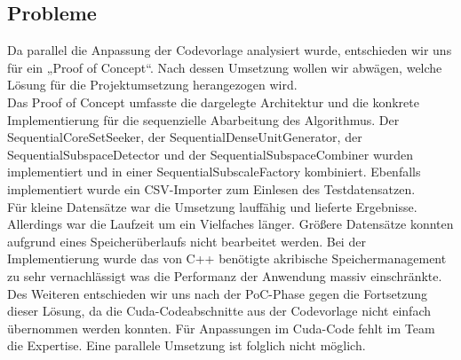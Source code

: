 \subsection{Probleme}
Da parallel die Anpassung der Codevorlage analysiert wurde, entschieden wir uns für ein „Proof of Concept“. Nach dessen
Umsetzung wollen wir abwägen, welche Lösung für die Projektumsetzung herangezogen wird.\\
Das Proof of Concept umfasste die dargelegte Architektur und die konkrete Implementierung für die sequenzielle
Abarbeitung des Algorithmus. Der SequentialCoreSetSeeker, der SequentialDenseUnitGenerator, der
SequentialSubspaceDetector und der SequentialSubspaceCombiner wurden implementiert und in einer
SequentialSubscaleFactory kombiniert. Ebenfalls implementiert wurde ein CSV-Importer zum Einlesen des Testdatensatzen.\\
Für kleine Datensätze war die Umsetzung lauffähig und lieferte Ergebnisse. Allerdings war die Laufzeit um ein Vielfaches
länger. Größere Datensätze konnten aufgrund eines Speicherüberlaufs nicht bearbeitet werden. Bei der Implementierung
wurde das von C++ benötigte akribische Speichermanagement zu sehr vernachlässigt was die Performanz der Anwendung massiv
einschränkte.\\
Des Weiteren entschieden wir uns nach der PoC-Phase gegen die Fortsetzung dieser Lösung, da die Cuda-Codeabschnitte aus
der Codevorlage nicht einfach übernommen werden konnten. Für Anpassungen im Cuda-Code fehlt im Team die Expertise. Eine
parallele Umsetzung ist folglich nicht möglich.

